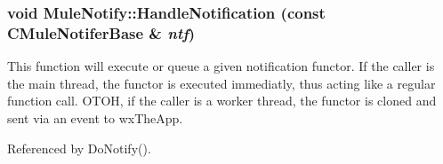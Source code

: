 \subsubsection[{HandleNotification}]{\setlength{\rightskip}{0pt plus 5cm}void MuleNotify::HandleNotification (const CMuleNotiferBase \& {\em ntf})}\label{namespaceMuleNotify_a302cb8a5fd33c95db44adbac3551cdca}


This function will execute or queue a given notification functor. If the caller is the main thread, the functor is executed immediatly, thus acting like a regular function call. OTOH, if the caller is a worker thread, the functor is cloned and sent via an event to wxTheApp. 

Referenced by DoNotify().